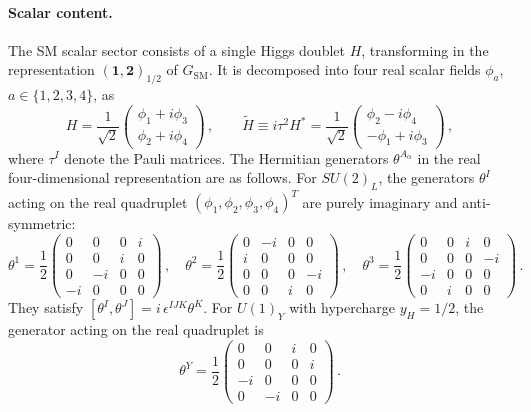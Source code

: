 \paragraph{Scalar content.}
The SM scalar sector consists of a single Higgs doublet $H$, transforming in the representation $(\mathbf{1},\mathbf{2})_{1/2}$ of $G_{\text{SM}}$. It is decomposed into four real scalar fields $\phi_a$, $a\in\{1,2,3,4\}$, as
\begin{equation}\label{eq:Higgs_decomposition}
    H = \frac{1}{\sqrt{2}}\begin{pmatrix} \phi_1 + i \phi_3 \\ \phi_2 + i \phi_4 \end{pmatrix}\,,\qquad
    \widetilde H \equiv i\tau^2 H^* = \frac{1}{\sqrt{2}}\begin{pmatrix} \phi_2 - i \phi_4 \\ -\phi_1 + i \phi_3 \end{pmatrix}\,,
\end{equation}
where $\tau^I$ denote the Pauli matrices. The Hermitian generators $\theta^{A_\alpha}$ in the real four-dimensional representation are as follows.
For $SU(2)_L$, the generators $\theta^I$ acting on the real quadruplet $(\phi_1,\phi_2,\phi_3,\phi_4)^T$ are purely imaginary and anti-symmetric:
\begin{equation}\label{eq:SU2_scalar_gens}
    \theta^1 = \frac{1}{2}\begin{pmatrix} 0 & 0 & 0 & i \\ 0 & 0 & i & 0 \\ 0 & -i & 0 & 0 \\ -i & 0 & 0 & 0 \end{pmatrix}\,,\quad
    \theta^2 = \frac{1}{2}\begin{pmatrix} 0 & -i & 0 & 0 \\ i & 0 & 0 & 0 \\ 0 & 0 & 0 & -i \\ 0 & 0 & i & 0 \end{pmatrix}\,,\quad
    \theta^3 = \frac{1}{2}\begin{pmatrix} 0 & 0 & i & 0 \\ 0 & 0 & 0 & -i \\ -i & 0 & 0 & 0 \\ 0 & i & 0 & 0 \end{pmatrix}\,.
\end{equation}
They satisfy $[\theta^I,\theta^J]=i\,\epsilon^{IJK}\theta^K$.
For $U(1)_Y$ with hypercharge $y_H = 1/2$, the generator acting on the real quadruplet is
\begin{equation}\label{eq:U1Y_scalar_gen}
    \theta^{Y} = \frac{1}{2}\begin{pmatrix} 0 & 0 & i & 0 \\ 0 & 0 & 0 & i \\ -i & 0 & 0 & 0 \\ 0 & -i & 0 & 0 \end{pmatrix}\,.
\end{equation}

